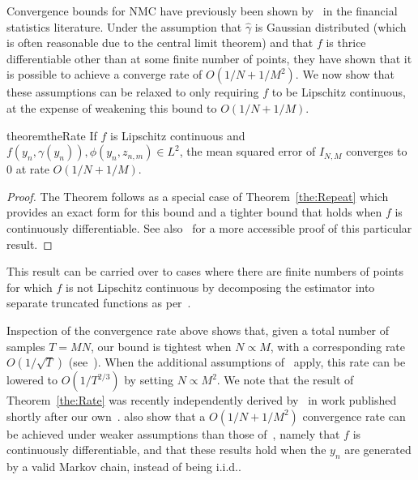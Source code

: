 Convergence bounds for NMC have previously been shown by~\citet{hong2009estimating} in the 
financial statistics literature.  Under the assumption that $\hat{\gamma}$ is Gaussian distributed
(which is often reasonable due to the central limit theorem) and that $f$ is thrice differentiable
other than at some finite number of points, they have shown that it is possible to achieve a
converge rate of $O(1/N+1/M^2)$.  We now show that these assumptions can be relaxed to only requiring
$f$ to be Lipschitz continuous, at the expense of weakening this bound to $O(1/N+1/M)$.
\vspace{-5pt}
\begin{restatable}{theorem}{theRate} \label{the:Rate}
	If $f$ is Lipschitz continuous and $f(y_n, \gamma(y_n)), \phi(y_n, z_{n,m}) \in
	L^2$, the mean squared error of $I_{N,M}$ converges to $0$ at rate $O\left(1/N +
	1/M\right)$.
\end{restatable}
\vspace{-12pt}
\begin{proof}
The Theorem follows as a special case of Theorem~\ref{the:Repeat} which
provides an exact form for this bound and a tighter bound
that holds when $f$ is continuously differentiable.  See also~\cite{rainforth2017pitfalls}
for a more accessible proof of this particular result.
\end{proof}
\vspace{-12pt}
\begin{remark}
This result can be carried over to cases where there are finite numbers of points for which $f$ is
not Lipschitz continuous by decomposing the estimator into separate truncated functions as
per~\cite{hong2009estimating}.
\end{remark}
\vspace{-8pt}
\noindent Inspection of the convergence rate above shows that, given a total number of samples
$T=MN$, our bound is tightest when $N\propto M$, with a
corresponding rate $O(1/\sqrt{T})$ (see~\cite{rainforth2017pitfalls}). 
When the additional assumptions of~\citet{hong2009estimating}
apply, this rate can be lowered to $O(1/T^{2/3})$ by setting $N \propto M^2$.  
We note that
the result of Theorem~\ref{the:Rate} was recently independently derived by~\citet{fort2016mcmc}
in work published shortly after our own~\citep{rainforth2016pitfalls}.
\citet{fort2016mcmc} also show that a $O(1/N+1/M^2)$ convergence rate can be achieved under
weaker assumptions than those of~\citet{hong2009estimating}, namely that $f$ is continuously differentiable,
and that these results hold when the $y_n$ are generated by a valid Markov chain, instead of being i.i.d..

